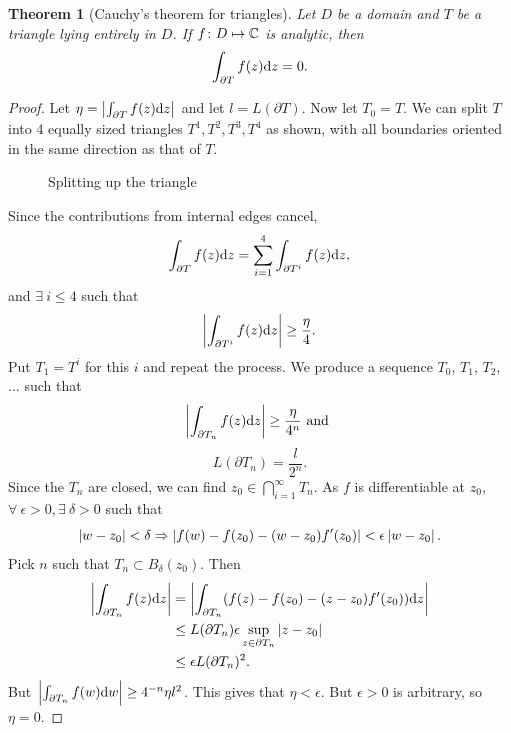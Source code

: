 \documentclass{notes}
\theoremstyle{plain}
\newtheorem{theorem}[proposition]{Theorem}
\begin{document}
\begin{theorem}[Cauchy's theorem for triangles]%
Let $D$ be a domain and $T$ be a triangle lying entirely in $D$.  If
$f \colon D \mapsto \mathbb{C}$ is analytic, then
\[
\int_{\partial T} f(z) \mathrm{d} z = 0.
\]
\end{theorem}

\begin{proof}
Let $\eta = \left|\int_{\partial T} f(z) \mathrm{d} z\right|$ and let $l = L(\partial T)$.
Now let $T_0 = T$.  We can split $T$ into 4 equally sized triangles
$T^1, T^2, T^3, T^4$ as shown, with all boundaries oriented in the same
direction as that of $T$.

\begin{figure}[h]
\begin{center}
\end{center}
\caption{Splitting up the triangle}
\end{figure}

Since the contributions from internal edges cancel, 
\[
\int_{\partial T} f(z) \mathrm{d} z = \sum_{i=1}^4 \int_{\partial T^i} f(z) \mathrm{d} z,
\]
and $\exists\ i \le 4$ such that
\[
\left|\int_{\partial T^i} f(z) \mathrm{d} z\right| \ge \frac{\eta}{4}.
\]
Put $T_1 = T^i$ for this $i$ and repeat the process.  We produce a sequence
$T_0$, $T_1$, $T_2$, $\dots$ such that
\[
\left|\int_{\partial T_n} f(z) \mathrm{d} z\right| \ge \frac{\eta}{4^n} \text{ and }
\]
\[
L(\partial T_n) = \frac{l}{2^n}.
\]
Since the $T_n$ are closed, we can find $z_0 \in \bigcap_{i=1}^\infty T_n$.
As $f$ is differentiable at $z_0$, $\forall\ \epsilon > 0, \exists\ \delta
> 0$ such that
\[
\left|w-z_0\right| < \delta \Rightarrow \left|f(w) - f(z_0)
- (w-z_0)f'(z_0)\right| < \epsilon \left|w-z_0\right|.
\]
Pick $n$ such that $T_n \subset B_\delta (z_0)$.  Then
\begin{align*}
\left|\int_{\partial T_n} f(z) \mathrm{d} z\right|
&= \left|\int_{\partial T_n} (f(z) - f(z_0) - (z-z_0) f'(z_0)) \mathrm{d} z\right| \\
&\le L(\partial T_n) \epsilon \sup_{z \in \partial T_n} \left|z-z_0\right| \\
&\le \epsilon L(\partial T_n)^2.
\end{align*}
But $\left|\int_{\partial T_n} f(w) \mathrm{d} w\right| \ge 4^{-n} \eta l^2$.  This gives
that $\eta < \epsilon$.  But $\epsilon > 0$ is arbitrary, so $\eta = 0$.
\end{proof}
\end{document}

